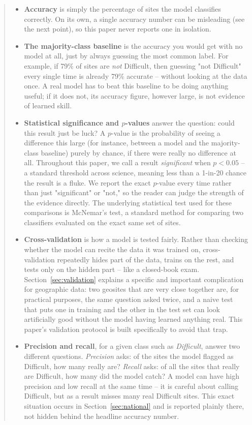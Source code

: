 \documentclass[11pt,a4paper]{article}
\newenvironment{termbox}
  {\begin{quote}\small\begin{itemize}[leftmargin=1.1em]}
  {\end{itemize}\end{quote}}
\begin{document}
\begin{termbox}
\item \textbf{Accuracy} is simply the percentage of sites the model classifies correctly. On its own, a single accuracy number can be misleading (see the next point), so this paper never reports one in isolation.
\item \textbf{The majority-class baseline} is the accuracy you would get with no model at all, just by always guessing the most common label. For example, if 79\% of sites are \emph{not} Difficult, then guessing "not Difficult" every single time is already 79\% accurate -- without looking at the data once. A real model has to beat this baseline to be doing anything useful; if it does not, its accuracy figure, however large, is not evidence of learned skill.
\item \textbf{Statistical significance and $p$-values} answer the question: could this result just be luck? A $p$-value is the probability of seeing a difference this large (for instance, between a model and the majority-class baseline) purely by chance, if there were really no difference at all. Throughout this paper, we call a result \emph{significant} when $p<0.05$ -- a standard threshold across science, meaning less than a 1-in-20 chance the result is a fluke. We report the exact $p$-value every time rather than just "significant" or "not," so the reader can judge the strength of the evidence directly. The underlying statistical test used for these comparisons is McNemar's test, a standard method for comparing two classifiers evaluated on the exact same set of sites.
\item \textbf{Cross-validation} is how a model is tested fairly. Rather than checking whether the model can recite the data it was trained on, cross-validation repeatedly hides part of the data, trains on the rest, and tests only on the hidden part -- like a closed-book exam. Section~\ref{sec:validation} explains a specific and important complication for geographic data: two geosites that are very close together are, for practical purposes, the same question asked twice, and a naive test that puts one in training and the other in the test set can look artificially good without the model having learned anything real. This paper's validation protocol is built specifically to avoid that trap.
\item \textbf{Precision and recall}, for a given class such as \emph{Difficult}, answer two different questions. \emph{Precision} asks: of the sites the model flagged as Difficult, how many really are? \emph{Recall} asks: of all the sites that really are Difficult, how many did the model catch? A model can have high precision and low recall at the same time -- it is careful about calling Difficult, but as a result misses many real Difficult sites. This exact situation occurs in Section~\ref{sec:national} and is reported plainly there, not hidden behind the headline accuracy number.

\end{termbox}
\end{document}
